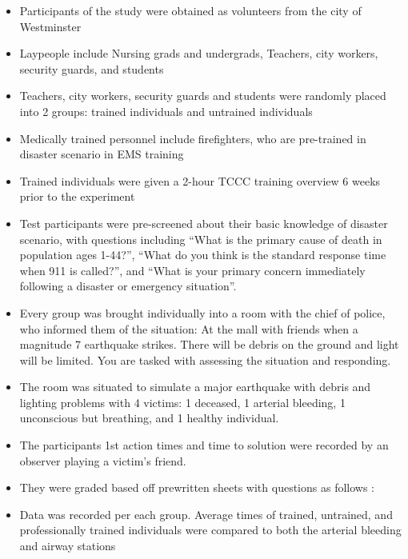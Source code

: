 \documentclass[]{article}
\author{}
\date{}
\begin{document}
\begin{itemize}
\itemsep1pt\parskip0pt
\item
  Participants of the study were obtained as volunteers from the city of
  Westminster
\item
  Laypeople include Nursing grads and undergrads, Teachers, city
  workers, security guards, and students
\item
  Teachers, city workers, security guards and students were randomly
  placed into 2 groups: trained individuals and untrained individuals
\item
  Medically trained personnel include firefighters, who are pre-trained
  in disaster scenario in EMS training
\item
  Trained individuals were given a 2-hour TCCC training overview 6 weeks
  prior to the experiment
\item
  Test participants were pre-screened about their basic knowledge of
  disaster scenario, with questions including ``What is the primary
  cause of death in population ages 1-44?'', ``What do you think is the
  standard response time when 911 is called?'', and ``What is your
  primary concern immediately following a disaster or emergency
  situation''.
\item
  Every group was brought individually into a room with the chief of
  police, who informed them of the situation: At the mall with friends
  when a magnitude 7 earthquake strikes. There will be debris on the
  ground and light will be limited. You are tasked with assessing the
  situation and responding.
\item
  The room was situated to simulate a major earthquake with debris and
  lighting problems with 4 victims: 1 deceased, 1 arterial bleeding, 1
  unconscious but breathing, and 1 healthy individual.
\item
  The participants 1st action times and time to solution were recorded
  by an observer playing a victim's friend.
\item
  They were graded based off prewritten sheets with questions as follows
  :
\item
  Data was recorded per each group. Average times of trained, untrained,
  and professionally trained individuals were compared to both the
  arterial bleeding and airway stations
\end{itemize}
\end{document}
